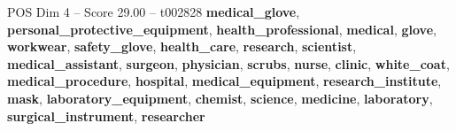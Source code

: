 \begin{textsample}{POS Dim 4 – Score 29.00 – t002828}  \label{ex:f4_pos_021}
\textbf{medical\_glove}, \textbf{personal\_protective\_equipment}, \textbf{health\_professional}, \textbf{medical}, \textbf{glove}, \textbf{workwear}, \textbf{safety\_glove}, \textbf{health\_care}, \textbf{research}, \textbf{scientist}, \textbf{medical\_assistant}, \textbf{surgeon}, \textbf{physician}, \textbf{scrubs}, \textbf{nurse}, \textbf{clinic}, \textbf{white\_coat}, \textbf{medical\_procedure}, \textbf{hospital}, \textbf{medical\_equipment}, \textbf{research\_institute}, \textbf{mask}, \textbf{laboratory\_equipment}, \textbf{chemist}, \textbf{science}, \textbf{medicine}, \textbf{laboratory}, \textbf{surgical\_instrument}, \textbf{researcher}

\end{textsample}
